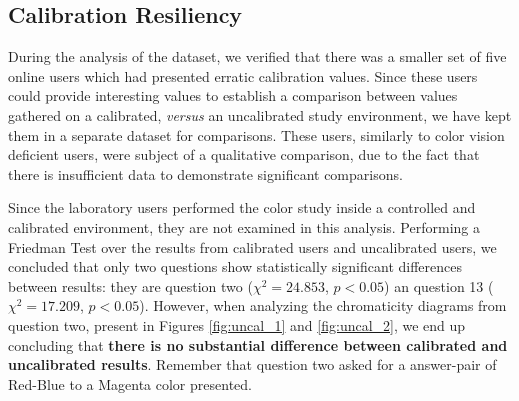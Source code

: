 \subsection{Calibration Resiliency}
\label{subsec:results_calibration}
%
During the analysis of the dataset, we verified that there was a smaller set of five online users which had presented erratic calibration values. Since these users could provide interesting values to establish a comparison between values gathered on a calibrated,
\emph{versus} an uncalibrated study environment, we have kept them in a separate dataset for comparisons. These users, similarly to color vision deficient users, were subject of a qualitative comparison, due to the fact that there is insufficient data to
demonstrate significant comparisons. \par
%
Since the laboratory users performed the color study inside a controlled and calibrated environment, they are not examined in this analysis. Performing a Friedman Test over the results from calibrated users and uncalibrated users, we concluded that only two questions
show statistically significant differences between results: they are question two ($\chi^2 = 24.853$, $p < 0.05$) an question 13 ($\chi^2 = 17.209$, $p < 0.05$). However, when analyzing the chromaticity diagrams from question two, present in Figures \ref{fig:uncal_1}
and \ref{fig:uncal_2}, we end up concluding that \textbf{there is no substantial difference between calibrated and uncalibrated results}. Remember that question two asked for a answer-pair of Red-Blue to a Magenta color presented.
%
